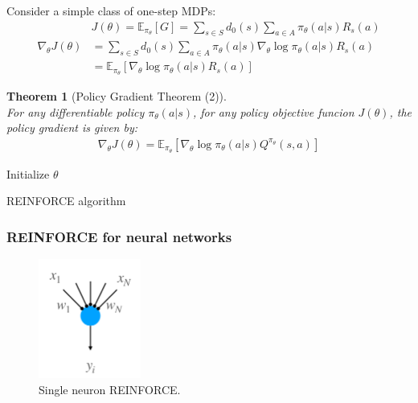 \documentclass[11pt]{book} %
\newtheorem{theorem}{Theorem}[section]
\begin{document}
Consider a simple class of one-step MDPs: 
\begin{align*}
    &J(\theta) = \mathbb{E}_{\pi_{\theta}}[G] = \sum_{s \in S} d_0(s) \sum_{a \in A} \pi_{\theta}(a|s) R_s(a) \\ 
    \nabla_{\theta} J(\theta) &= \sum_{s \in S} d_0(s) \sum_{a \in A} \pi_{\theta}(a|s) \nabla_{\theta} \log \pi_{\theta}(a|s) R_s(a) \\
    &= \mathbb{E}_{\pi_{\theta}} \left[ \nabla_{\theta} \log \pi_{\theta}(a|s) R_s(a) \right]
\end{align*}

\begin{theorem}[Policy Gradient Theorem (2)]\ \\
    For any differentiable policy $\pi_{\theta}(a|s)$, for any policy objective funcion $J(\theta)$, the policy gradient is given by:
    \begin{align*}
        \nabla_{\theta} J(\theta) = \mathbb{E}_{\pi_{\theta}} \left[ \nabla_{\theta} \log \pi_{\theta}(a|s) Q^{\pi_\theta}(s, a) \right]
    \end{align*}
    
\end{theorem}

\begin{algorithm}[H]
    \SetNoFillComment
    \SetAlgoLined
    Initialize $\theta$ \\
    \caption{REINFORCE algorithm} \label{REINFORCE algorithm}
\end{algorithm}

\subsubsection{REINFORCE for neural networks}
\begin{figure}[ht]
    \centering
    \includegraphics[width=0.3\textwidth]{./Figs/single_neuron_reinforce.jpeg}
    \caption{Single neuron REINFORCE.}
    \label{fig:REINFORCE_NN}
\end{figure}
\end{document}
